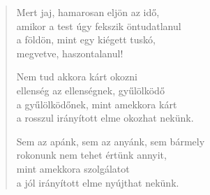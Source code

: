 \begin{verse}
 Mert jaj, hamarosan eljön az idő,\\
amikor a test úgy fekszik öntudatlanul\\
a földön, mint egy kiégett tuskó,\\
megvetve, haszontalanul!

 Nem tud akkora kárt okozni\\
ellenség az ellenségnek, gyűlölködő\\
a gyűlölködőnek, mint amekkora kárt\\
a rosszul irányított elme okozhat nekünk.

\newpage

 Sem az apánk, sem az anyánk, sem bármely\\
rokonunk nem tehet értünk annyit,\\
mint amekkora szolgálatot\\
a jól irányított elme nyújthat nekünk.

\end{verse}
